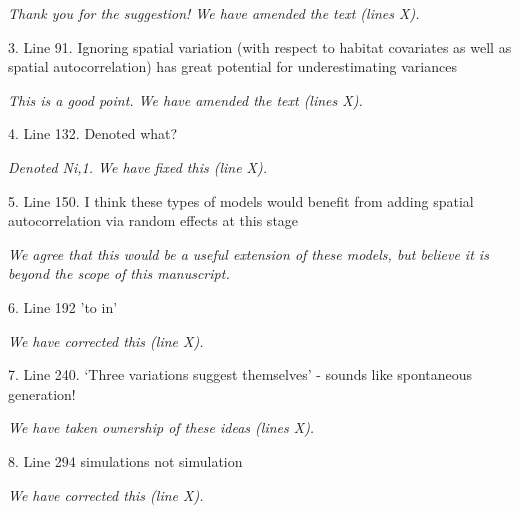 \documentclass[12pt,english]{article}
\begin{document}
\begin{spacing}{1.9}
\begin{flushleft}
\textit{Thank you for the suggestion!  We have amended the text (lines X).}

3. Line 91. Ignoring spatial variation (with respect to habitat covariates as well as spatial autocorrelation) has great potential for underestimating variances

\textit{This is a good point.  We have amended the text (lines X).}

4. Line 132. Denoted what?

\textit{Denoted Ni,1.  We have fixed this (line X).}

5. Line 150. I think these types of models would benefit from adding spatial autocorrelation via random effects at this stage

\textit{We agree that this would be a useful extension of these models, but believe it is beyond the scope of this manuscript.}

6. Line 192 'to in'

\textit{We have corrected this (line X).}

7. Line 240. `Three variations suggest themselves' - sounds like spontaneous generation!

\textit{We have taken ownership of these ideas (lines X).}

8. Line 294 simulations not simulation

\textit{We have corrected this (line X).}
\end{flushleft}
\end{spacing}
\end{document}
